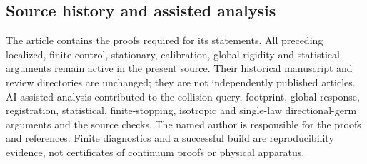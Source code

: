 \documentclass[11pt]{amsart}
\begin{document}
\subsection*{Source history and assisted analysis}
The article contains the proofs required for its statements. All
preceding localized, finite-control, stationary, calibration, global
rigidity and statistical arguments remain active in the present source.
Their historical manuscript and review directories are unchanged; they
are not independently published articles. AI-assisted analysis
contributed to the collision-query, footprint, global-response,
registration, statistical, finite-stopping, isotropic and single-law
directional-germ arguments and
the source checks. The named author is responsible for the proofs and
references. Finite diagnostics and a successful build are reproducibility
evidence, not certificates of continuum proofs or physical apparatus.

\end{document}
